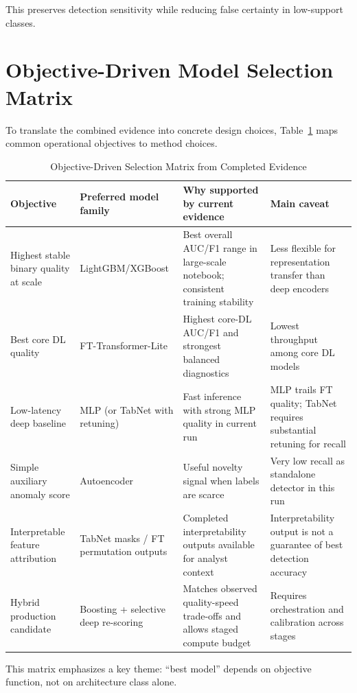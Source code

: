 \documentclass[10pt,journal]{IEEEtran}
\begin{document}
This preserves detection sensitivity while reducing false certainty in low-support classes.

\section{Objective-Driven Model Selection Matrix}
To translate the combined evidence into concrete design choices, Table~\ref{tab:selection_matrix} maps common operational objectives to method choices.

\begin{table}[!t]
\caption{Objective-Driven Selection Matrix from Completed Evidence}
\label{tab:selection_matrix}
\centering
\begin{tabular}{p{3.0cm}p{2.5cm}p{4.2cm}p{5.0cm}}
\toprule
Objective & Preferred model family & Why supported by current evidence & Main caveat \\
\midrule
Highest stable binary quality at scale & LightGBM/XGBoost & Best overall AUC/F1 range in large-scale notebook; consistent training stability & Less flexible for representation transfer than deep encoders \\
Best core DL quality & FT-Transformer-Lite & Highest core-DL AUC/F1 and strongest balanced diagnostics & Lowest throughput among core DL models \\
Low-latency deep baseline & MLP (or TabNet with retuning) & Fast inference with strong MLP quality in current run & MLP trails FT quality; TabNet requires substantial retuning for recall \\
Simple auxiliary anomaly score & Autoencoder & Useful novelty signal when labels are scarce & Very low recall as standalone detector in this run \\
Interpretable feature attribution & TabNet masks / FT permutation outputs & Completed interpretability outputs available for analyst context & Interpretability output is not a guarantee of best detection accuracy \\
Hybrid production candidate & Boosting + selective deep re-scoring & Matches observed quality-speed trade-offs and allows staged compute budget & Requires orchestration and calibration across stages \\
\bottomrule
\end{tabular}
\end{table}

This matrix emphasizes a key theme: ``best model'' depends on objective function, not on architecture class alone.
\end{document}
